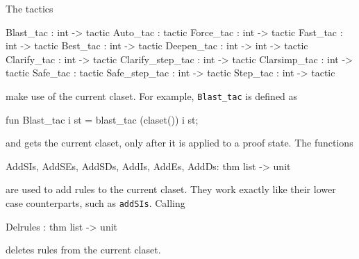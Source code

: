 The tactics
\begin{ttbox}
Blast_tac        : int -> tactic
Auto_tac         :        tactic
Force_tac        : int -> tactic
Fast_tac         : int -> tactic
Best_tac         : int -> tactic
Deepen_tac       : int -> int -> tactic
Clarify_tac      : int -> tactic
Clarify_step_tac : int -> tactic
Clarsimp_tac     : int -> tactic
Safe_tac         :        tactic
Safe_step_tac    : int -> tactic
Step_tac         : int -> tactic
\end{ttbox}
%
make use of the current claset.  For example, \texttt{Blast_tac} is defined as 
\begin{ttbox}
fun Blast_tac i st = blast_tac (claset()) i st;
\end{ttbox}
and gets the current claset, only after it is applied to a proof
state.  The functions
\begin{ttbox}
AddSIs, AddSEs, AddSDs, AddIs, AddEs, AddDs: thm list -> unit
\end{ttbox}
  
  
are used to add rules to the current claset.  They work exactly like their
lower case counterparts, such as \texttt{addSIs}.  Calling
\begin{ttbox}
Delrules : thm list -> unit
\end{ttbox}
deletes rules from the current claset. 

